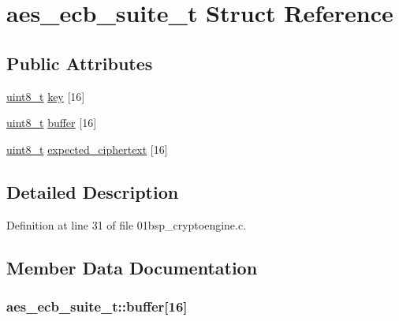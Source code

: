 \hypertarget{structaes__ecb__suite__t}{}\section{aes\+\_\+ecb\+\_\+suite\+\_\+t Struct Reference}
\label{structaes__ecb__suite__t}
\subsection*{Public Attributes}
\begin{DoxyCompactItemize}
\item 
\hyperlink{_p_e___types_8h_aba7bc1797add20fe3efdf37ced1182c5}{uint8\+\_\+t} \hyperlink{structaes__ecb__suite__t_a1b2b0f6423dcd259e72ca0f9e14ddc24}{key} \mbox{[}16\mbox{]}
\item 
\hyperlink{_p_e___types_8h_aba7bc1797add20fe3efdf37ced1182c5}{uint8\+\_\+t} \hyperlink{structaes__ecb__suite__t_ae9d2eac1d68b8d1f2559e58b9f1e8772}{buffer} \mbox{[}16\mbox{]}
\item 
\hyperlink{_p_e___types_8h_aba7bc1797add20fe3efdf37ced1182c5}{uint8\+\_\+t} \hyperlink{structaes__ecb__suite__t_a62ced811c4dbadab25cf16e6fb73b9c5}{expected\+\_\+ciphertext} \mbox{[}16\mbox{]}
\end{DoxyCompactItemize}


\subsection{Detailed Description}


Definition at line 31 of file 01bsp\+\_\+cryptoengine.\+c.



\subsection{Member Data Documentation}
\subsubsection[{\texorpdfstring{buffer}{buffer}}]{ aes\+\_\+ecb\+\_\+suite\+\_\+t\+::buffer\mbox{[}16\mbox{]}}\hypertarget{structaes__ecb__suite__t_ae9d2eac1d68b8d1f2559e58b9f1e8772}{}\label{structaes__ecb__suite__t_ae9d2eac1d68b8d1f2559e58b9f1e8772}


